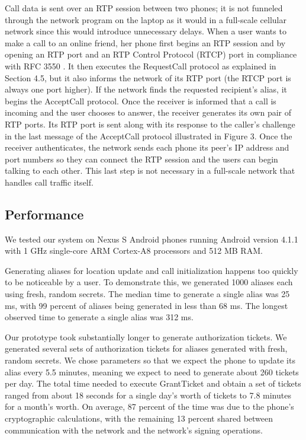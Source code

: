 \documentclass[11pt]{article}
\begin{document}
Call data is sent over an RTP session between two phones; it is not funneled through the network program on the laptop as it would in a full-scale cellular network since this would introduce unnecessary delays. When a user wants to make a call to an online friend, her phone first begins an RTP session and by opening an RTP port and an RTP Control Protocol (RTCP) port in compliance with RFC 3550 \cite{schulzrinne2003rfc}. It then executes the RequestCall protocol as explained in Section 4.5, but it also informs the network of its RTP port (the RTCP port is always one port higher). If the network finds the requested recipient's alias, it begins the AcceptCall protocol. Once the receiver is informed that a call is incoming and the user chooses to answer, the receiver generates its own pair of RTP ports. Its RTP port is sent along with its response to the caller's challenge in the last message of the AcceptCall protocol illustrated in Figure 3. Once the receiver authenticates, the network sends each phone its peer's IP address and port numbers so they can connect the RTP session and the users can begin talking to each other. This last step is not necessary in a full-scale network that handles call traffic itself.

\subsection{Performance}

We tested our system on Nexus S Android phones running Android version 4.1.1 with 1 GHz single-core ARM Cortex-A8 processors and 512 MB RAM. 

Generating aliases for location update and call initialization happens too quickly to be noticeable by a user. To demonstrate this, we generated 1000 aliases each using fresh, random secrets. The median time to generate a single alias was 25 ms, with 99 percent of aliases being generated in less than 68 ms. The longest observed time to generate a single alias was 312 ms.

Our prototype took substantially longer to generate authorization tickets. We generated several sets of authorization tickets for aliases generated with fresh, random secrets. We chose parameters so that we expect the phone to update its alias every 5.5 minutes, meaning we expect to need to generate about 260 tickets per day. The total time needed to execute GrantTicket and obtain a set of tickets ranged from about 18 seconds for a single day's worth of tickets to 7.8 minutes for a month's worth. On average, 87 percent of the time was due to the phone's cryptographic calculations, with the remaining 13 percent shared between communication with the network and the network's signing operations.
\end{document}
